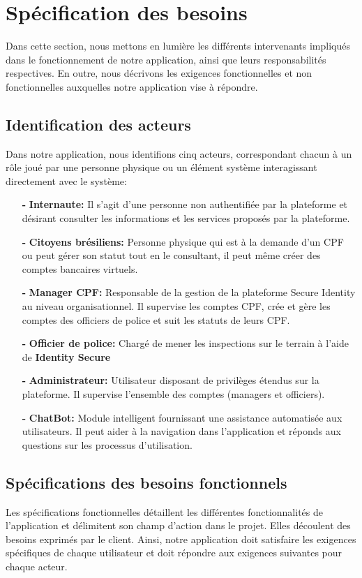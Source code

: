\section{Spécification des besoins}
Dans cette section, nous mettons en lumière les différents intervenants impliqués dans le fonctionnement de notre application, ainsi que leurs responsabilités respectives. En outre, nous décrivons les exigences fonctionnelles et non fonctionnelles auxquelles notre application vise à répondre.

\subsection{Identification des acteurs}
Dans notre application, nous identifions cinq acteurs, correspondant chacun à un rôle joué par une personne physique ou un élément système interagissant directement avec le système:

\begin{itemize}
  \item[\textbf{-}] \textbf{Internaute:} Il s'agit d'une personne non authentifiée par la plateforme et désirant consulter les informations et les services proposés par la plateforme.

  \item[\textbf{-}] \textbf{Citoyens brésiliens:} Personne physique qui est à la demande d'un CPF ou peut gérer son statut tout en le consultant, il peut même créer des comptes bancaires virtuels.

  \item[\textbf{-}] \textbf{Manager CPF:} Responsable de la gestion de la plateforme Secure Identity au niveau organisationnel. Il supervise les comptes CPF, crée et gère les comptes des officiers de police et suit les statuts de leurs CPF.

  \item[\textbf{-}] \textbf{Officier de police:} Chargé de mener les inspections sur le terrain à l'aide de \textbf{Identity Secure}
\item[\textbf{-}] \textbf{Administrateur:} Utilisateur disposant de privilèges étendus sur la plateforme. Il supervise l’ensemble des comptes (managers et officiers).
  \item[\textbf{-}] \textbf{ChatBot:} Module intelligent fournissant une assistance automatisée aux utilisateurs. Il peut aider à la navigation dans l'application et réponds aux questions sur les processus d'utilisation.
\end{itemize}
\subsection{Spécifications des besoins fonctionnels}
Les spécifications fonctionnelles détaillent les différentes fonctionnalités de l'application et délimitent son champ d'action dans le projet. Elles découlent des besoins exprimés par le client. Ainsi, notre application doit satisfaire les exigences spécifiques de chaque utilisateur et doit répondre aux exigences suivantes pour chaque acteur.
\\
